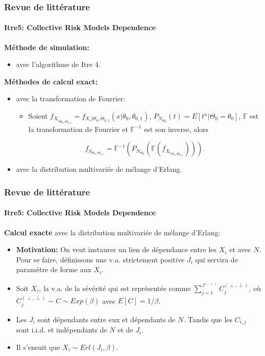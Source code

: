 \documentclass[11pt]{beamer}
\begin{document}
\begin{frame}
	\frametitle{Revue de littérature}
	\framesubtitle{Itre5: Collective Risk Models Dependence \cite{Itre5}}
	
	\textbf{Méthode de simulation:}
	\begin{itemize}
		\item avec l'algorithme de Itre 4.
	\end{itemize}
	\vspace{0.2cm}
	
	\textbf{Méthodes de calcul exact:}
	\begin{itemize}
		\item avec la transformation de Fourrier:
		\begin{itemize}
			\item Soient $f_{{X_i}_{\Theta_0, \Theta_{0,1}}} = f_{X_i|\Theta_0, \Theta_{0,1}}(x| \theta_0, \theta_{0,1})$, $P_{N_{\Theta_0}}(t) = E[t^n|\Theta_0 = \theta_0]$, $\mathbb{F}$ est la transformation de Fourrier et $\mathbb{F}^{-1}$ est son inverse, alors
		
			\begin{equation*}
				f_{S_{\Theta_0, \Theta_{0,1}}} = \mathbb{F}^{-1} \left(
					P_{N_{\Theta_0}}\left(
						\mathbb{F} \left(
							f_{{X_i}_{\Theta_0, \Theta_{0,1}}}
				\right) \right) \right).
			\end{equation*}
		\end{itemize}
		\item avec la distribution multivariée de mélange d'Erlang.
		
	\end{itemize}

	
	
\end{frame}


\begin{frame}
	\frametitle{Revue de littérature}
	\framesubtitle{Itre5: Collective Risk Models Dependence \cite{Itre5}}
	
	\textbf{Calcul exacte} avec la distribution multivariée de mélange d'Erlang:\\
	
	\begin{itemize}
		\item \textbf{Motivation:} On veut instaurer un lien de dépendance entre les $X_i$ et avec $N$.
		Pour se faire, définissons une v.a. strictement positive $J_i$ qui servira de paramètre de forme aux $X_i$.
		
		\item Soit $X_i$, la v.a. de la sévérité qui est représentée comme $\sum_{j=1}^{J^{(,\perp)}} C_j^{(\perp,\perp)}$, où $C_j^{(\perp,\perp)} \sim C \sim Exp(\beta)$ avec $E[C] = 1/\beta$. 
		
		\item Les $J_i$ sont dépendants entre eux et dépendants de $N$. Tandis que les $C_{i,j}$ sont i.i.d. et indépendants de $N$ et de $J_i$.
		
		\item Il s'ensuit que $X_i \sim Erl(J_i, \beta)$.
		
	\end{itemize}
\end{frame}
\end{document}
